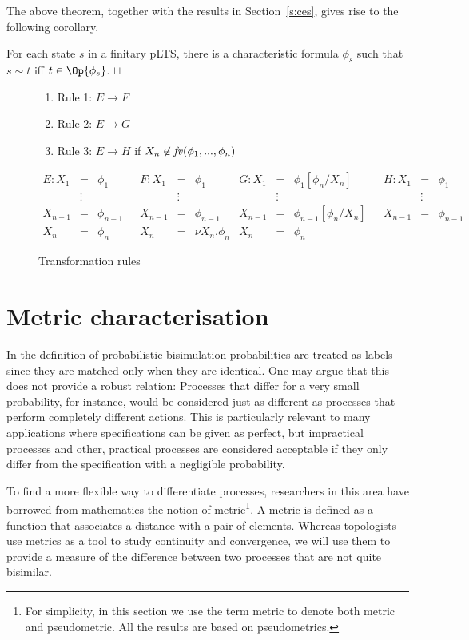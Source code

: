 \documentclass{article}
\def \BISI{\sim}
\def \fv{{\it fv}}
\def\squareforqed{\hbox{\rlap{$\sqcap$}$\sqcup$}}
\def\qed{\ifmmode\squareforqed\else{\unskip\nobreak\hfil
\penalty50\hskip1em\null\nobreak\hfil\squareforqed
\parfillskip=0pt\finalhyphendemerits=0\endgraf}\fi}
\begin{document}
The above theorem, together with the results in Section~\ref{s:ces},
gives rise to the following corollary.

\begin{corollary}
For each state $s$ in a finitary pLTS, there is a characteristic
formula $\phi_s $ such that $s\BISI t$ iff $t\in\Op{\phi_s }$.
\hfill\qed
\end{corollary}

\begin{figure}
\begin{enumerate}
\item Rule 1: $E \rightarrow F$
\item Rule 2: $E \rightarrow G$
\item Rule 3: $E \rightarrow H$ if $X_n\not\in\fv(\phi_1,...,\phi_n)$
\end{enumerate}

\[\begin{array}{rclrclrclrcl}
E: X_1 & = & \phi_1 \qquad & F: X_1 & = & \phi_1 \qquad & G: X_1 & =
&
       \phi_1[\phi_n/X_n] \qquad & H: X_1 & = & \phi_1 \\
       & \vdots & & & \vdots & &  & \vdots & & & \vdots & \\
   X_{n-1} & = & \phi_{n-1} & X_{n-1} & = & \phi_{n-1} & X_{n-1} & = &
       \phi_{n-1}[\phi_n/X_n] & X_{n-1} & = & \phi_{n-1} \\
   X_n & = & \phi_n & X_n & = & \nu X_n.\phi_n &  X_n & = & \phi_n & &
       &
\end{array}\]
\caption{Transformation rules}\label{f:rules}
\end{figure}


\section{Metric characterisation}\label{s:metric}
In the definition of probabilistic bisimulation probabilities are
treated as labels since they are matched only when they are
identical. One may argue that this does not provide a robust
relation: Processes that differ for a very small probability, for
instance, would be considered just as different as processes that
perform completely different actions. This is particularly relevant
to many applications where specifications can be given as perfect,
but impractical processes and other, practical processes are
considered acceptable if they only differ from the specification
with a negligible probability.

To find a more flexible way to differentiate processes, researchers
in this area have borrowed from mathematics the notion of
metric\footnote{For simplicity, in this section we use the term
metric to denote both metric and pseudometric.  All the results are
based on pseudometrics.}.  A metric is defined as a function that
associates a distance with a pair of elements. Whereas topologists
use metrics as a tool to study continuity and convergence, we will
use them to provide a measure of the difference between two
processes that are not quite bisimilar.
\end{document}
